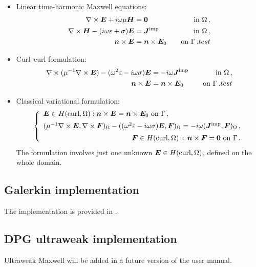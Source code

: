 \begin{itemize}
\item
{
Linear time-harmonic Maxwell equations:
\begin{alignat*}{3}
	\nabla \times \boldsymbol E + i \omega \mu \boldsymbol H
	&= \boldsymbol 0 &\quad \text{in } \Omega \, , \\
	\nabla \times \boldsymbol H - (i \omega \varepsilon + \sigma) \boldsymbol E 
	&= \boldsymbol J^{\text{imp}} &\quad \text{in } \Omega \, , \\
	\boldsymbol n \times \boldsymbol E &= \boldsymbol n \times \boldsymbol E_0 &\quad \text{on } \Gamma \, .
	test
\end{alignat*}
}
\item
{
Curl--curl formulation:
\begin{alignat*}{3}
	\nabla \times (\mu^{-1} \nabla \times \boldsymbol E) - (\omega^2 \varepsilon - i \omega \sigma) \boldsymbol E
	&= -i \omega \boldsymbol J^{\text{imp}}  &\quad \text{in } \Omega \, , \\
	\boldsymbol n \times \boldsymbol E &= \boldsymbol n \times \boldsymbol E_0 &\quad \text{on } \Gamma \, .
	test
\end{alignat*}
}
\item
{
Classical variational formulation:
\[
\left\{
\begin{array}{lll}
	\bs E \in \Hcurl : \bs n \times \bs E = \bs n \times \bs E_0 \text{ on } \Gamma \, , \\[5pt]
	(\mu^{-1} \curl \bs E,\curl \bs F)_\Omega - ((\omega^2 \eps - i \omega \sigma) \bs E, \bs F)_\Omega
	= -i \omega (\bs J^{\text{imp}}, \bs F)_\Omega \, , \\[5pt]
	\hfill
	\quad \bs F \in \Hcurl \, : \, \bs n \times \bs F = \bs 0 \text{ on } \Gamma \, .
\end{array}
\right.
\]
The formulation involves just one unknown $\boldsymbol E \in H(\text{curl}, \Omega)$, defined on the whole domain.
}
\end{itemize}

\subsection{Galerkin implementation}
\label{subsec:maxwell-galerkin}

The implementation is provided in .

\subsection{DPG ultraweak implementation}
\label{subsec:maxwell-galerkin}

Ultraweak Maxwell will be added in a future version of the user manual.



%



